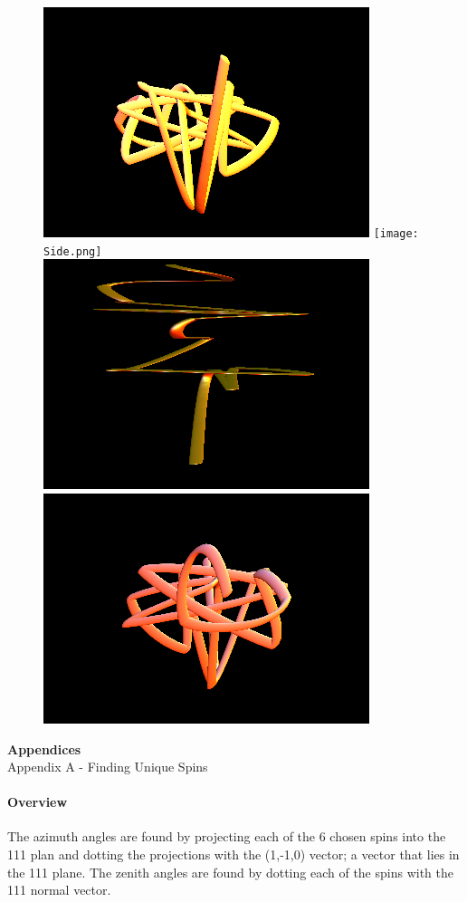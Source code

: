 \documentclass{article}
\begin{document}
\pagebreak

\begin{figure}[ht]
 \centering
\includegraphics[scale=0.4]{Front.png}
\texttt{[image: Side.png]}
\includegraphics[scale=0.4]{Top.png}
\includegraphics[scale=0.4]{Back.png}
 \end{figure}

\pagebreak
\LARGE\textbf{\centering Appendices} \\
\Large
Appendix A - Finding Unique Spins
\large
\paragraph{Overview}
The azimuth angles are found by projecting each of the 6 chosen spins into the 111 plan and dotting the projections
with the (1,-1,0) vector; a vector that lies in the 111 plane. The zenith angles are found by dotting each of the
spins with the 111 normal vector. 
\end{document}
